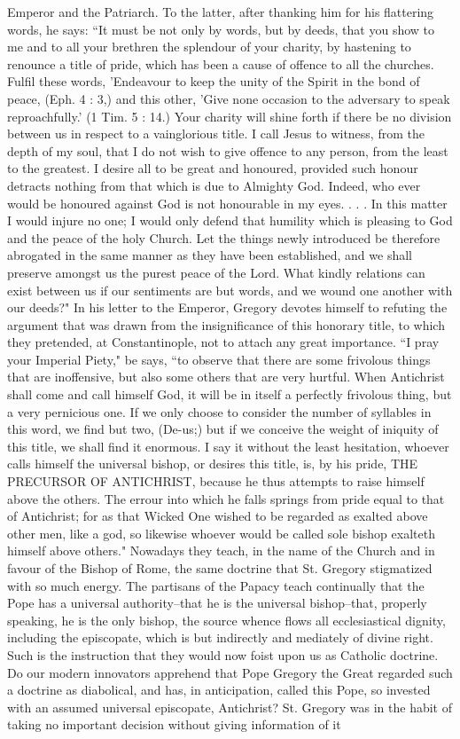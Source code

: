 Emperor and the Patriarch. To the latter, after thanking him for his flattering words, he says: “It must be not only by words, but by deeds, that you show to me and to all your brethren the splendour of your charity, by hastening to renounce a title of pride, which has been a cause of offence to all the churches. Fulfil these words, 'Endeavour to keep the unity of the Spirit in the bond of peace, (Eph. 4 : 3,) and this other, 'Give none occasion to the adversary to speak reproachfully.' (1 Tim. 5 : 14.) Your charity will shine forth if there be no division between us in respect to a vainglorious title. I call Jesus to witness, from the depth of my soul, that I do not wish to give offence to any person, from the least to the greatest. I desire all to be great and honoured, provided such honour detracts nothing from that which is due to Almighty God. Indeed, who ever would be honoured against God is not honourable in my eyes. . . . In this matter I would injure no one; I would only defend that humility which is pleasing to God and the peace of the holy Church. Let the things newly introduced be therefore abrogated in the same manner as they have been established, and we shall preserve amongst us the purest peace of the Lord. What kindly relations can exist between us if our sentiments are but words, and we wound one another with our deeds?" In his letter to the Emperor, Gregory devotes himself to refuting the argument that was drawn from the insignificance of this honorary title, to which they pretended, at Constantinople, not to attach any great importance. “I pray your Imperial Piety," be says, “to observe that there are some frivolous things that are inoffensive, but also some others that are very hurtful. When Antichrist shall come and call himself God, it will be in itself a perfectly frivolous thing, but a very pernicious one. If we only choose to consider the number of syllables in this word, we find but two, (De-us;) but if we conceive the weight of iniquity of this title, we shall find it enormous. I say it without the least hesitation, whoever calls himself the universal bishop, or desires this title, is, by his pride, THE PRECURSOR OF ANTICHRIST, because he thus attempts to raise himself above the others. The errour into which he falls springs from pride equal to that of Antichrist; for as that Wicked One wished to be regarded as exalted above other men, like a god, so likewise whoever would be called sole bishop exalteth himself above others." Nowadays they teach, in the name of the Church and in favour of the Bishop of Rome, the same doctrine that St. Gregory stigmatized with so much energy. The partisans of the Papacy teach continually that the Pope has a universal authority--that he is the universal bishop--that, properly speaking, he is the only bishop, the source whence flows all ecclesiastical dignity, including the episcopate, which is but indirectly and mediately of divine right. Such is the instruction that they would now foist upon us as Catholic doctrine. Do our modern innovators apprehend that Pope Gregory the Great regarded such a doctrine as diabolical, and has, in anticipation, called this Pope, so invested with an assumed universal episcopate, Antichrist? St. Gregory was in the habit of taking no important decision without giving information of it 